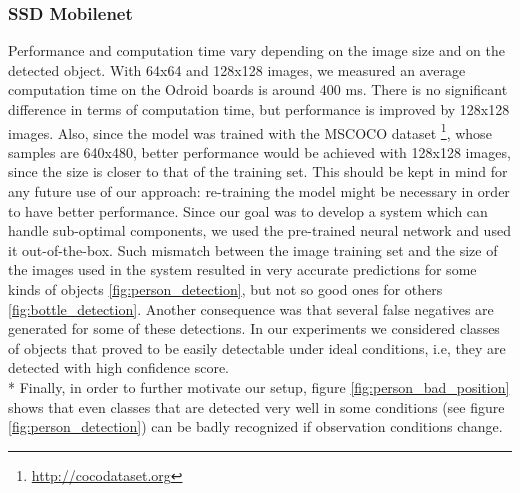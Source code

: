\documentclass[10pt,conference,compsocconf]{IEEEtran}
\begin{document}
\subsubsection{SSD Mobilenet}
\label{model:ssd}
Performance and computation time vary depending on the image size and on the detected object.
With 64x64 and 128x128 images, we measured an average computation time on the Odroid boards is around 400 ms. There is no significant difference in terms of computation time, but performance is improved by 128x128 images. Also, since the model was trained with the MSCOCO dataset \footnote{\url{http://cocodataset.org}}, whose samples are 640x480, better performance would be achieved with 128x128 images, since the size is closer to that of the training set.
This should be kept in mind for any future use of our approach: re-training the model might be necessary in order to have better performance.
Since our goal was to develop a system which can handle sub-optimal components, we used the pre-trained neural network and used it out-of-the-box. Such mismatch between the image training set and the size of the images used in the system resulted in very accurate predictions for some kinds of objects \ref{fig:person_detection}, but not so good ones for others \ref{fig:bottle_detection}. Another consequence was that several false negatives are generated for some of these detections. In our experiments we considered classes of objects that proved to be easily detectable under ideal conditions, i.e, they are detected with high confidence score.\\*
Finally, in order to further motivate our setup, figure \ref{fig:person_bad_position} shows that even classes that are detected very well in some conditions (see figure \ref{fig:person_detection}) can be badly recognized if observation conditions change.
\end{document}
